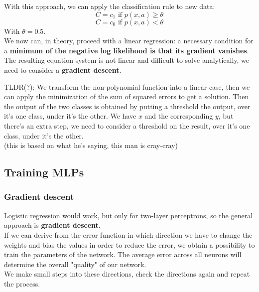\documentclass[11pt]{article}
\begin{document}
		With this approach, we can apply the classification rule to new data: 
		$$ C = c_1 \text{ if } p(x, a) \geq \theta $$
		$$ C = c_0 \text{ if } p(x, a) < \theta $$
		With $\theta = 0.5$.\\
		
		We now can, in theory, proceed with a linear regression: a necessary condition for a \textbf{minimum of the negative log likelihood is that its gradient vanishes}.\\
		
		The resulting equation system is not linear and difficult to solve analytically, we need to consider a \textbf{gradient descent}.\\
		
		\vfill 
		
		TLDR(?): We transform the non-polynomial function into a linear case, then we can apply the minimization of the sum of squared errors to get a solution. Then the output of the two classes is obtained by putting a threshold the output, over it's one class, under it's the other. We have $x$ and the corresponding $y$, but there's an extra step, we need to consider a threshold on the result, over it's one class, under it's the other.\\
		
		(this is based on what he's saying, this man is cray-cray)
		
		
		\newpage
		
		\subsection{Training MLPs}
		\subsubsection{Gradient descent}
		Logistic regression would work, but only for two-layer perceptrons, so the general approach is \textbf{gradient descent}.\\
		
		If we can derive from the error function in which direction we have to change the weights and bias the values in order to reduce the error, we obtain a possibility to train the parameters of the network. The average error across all neurons will determine the overall "quality" of our network. \\
		We make small steps into these directions, check the directions again and repeat the process.\\
		
\end{document}
